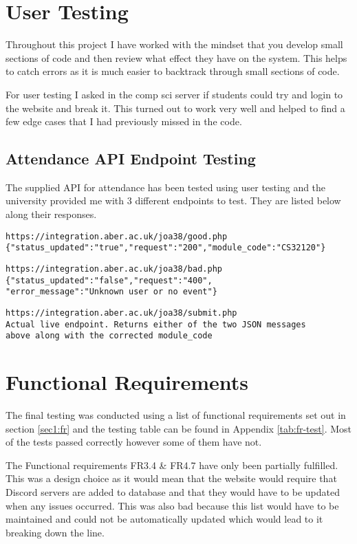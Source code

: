 \section{User Testing}\label{sec4:user-tesing}
Throughout this project I have worked with the mindset that you develop small sections of code and then review what effect they have on the system. This helps to catch errors as it is much easier to backtrack through small sections of code.

For user testing I asked in the comp sci server if students could try and login to the website and break it. This turned out to work very well and helped to find a few edge cases that I had previously missed in the code.

\subsection{Attendance API Endpoint Testing}
The supplied API for attendance has been tested using user testing and the university provided me with 3 different endpoints to test. They are listed below along their responses.

\begin{verbatim}
https://integration.aber.ac.uk/joa38/good.php
{"status_updated":"true","request":"200","module_code":"CS32120"}    
\end{verbatim}

\begin{verbatim}
https://integration.aber.ac.uk/joa38/bad.php
{"status_updated":"false","request":"400",
"error_message":"Unknown user or no event"}
\end{verbatim}

\begin{verbatim}
https://integration.aber.ac.uk/joa38/submit.php
Actual live endpoint. Returns either of the two JSON messages 
above along with the corrected module_code
\end{verbatim}

\section{Functional Requirements}\label{sec4:fr}
The final testing was conducted using a list of functional requirements set out in section \ref{sec1:fr} and the testing table can be found in Appendix \ref{tab:fr-test}. Most of the tests passed correctly however some of them have not.

The Functional requirements FR3.4 \& FR4.7 have only been partially fulfilled. This was a design choice as it would mean that the website would require that Discord servers are added to database and that they would have to be updated when any issues occurred. This was also bad because this list would have to be maintained and could not be automatically updated which would lead to it breaking down the line.